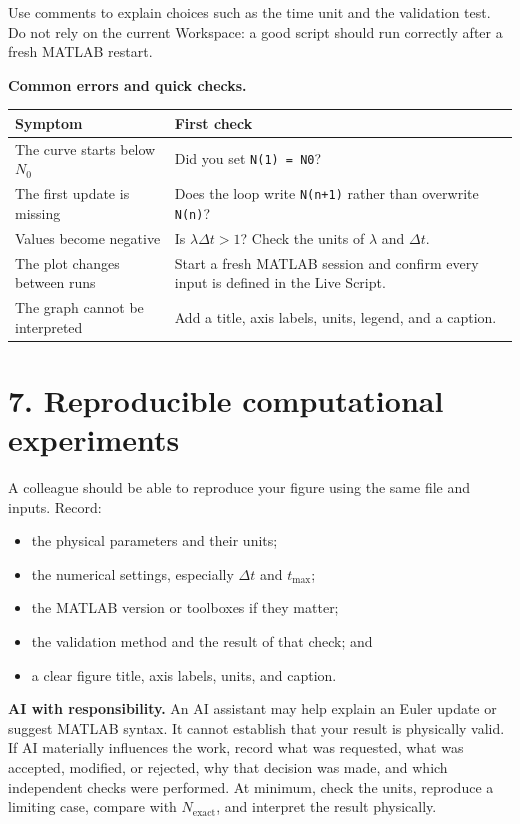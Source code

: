 \documentclass[11pt,a4paper]{article}
\begin{document}
Use comments to explain choices such as the time unit and the validation test. Do not rely on the current Workspace: a good script should run correctly after a fresh MATLAB restart.

\textbf{Common errors and quick checks.}
\begin{center}
\small
\begin{tabular}{>{\raggedright\arraybackslash}p{.38\linewidth}>{\raggedright\arraybackslash}p{.48\linewidth}}
\toprule
\textbf{Symptom} & \textbf{First check}\\ \midrule
The curve starts below $N_0$ & Did you set \texttt{N(1) = N0}?\\
The first update is missing & Does the loop write \texttt{N(n+1)} rather than overwrite \texttt{N(n)}?\\
Values become negative & Is $\lambda\Delta t>1$? Check the units of $\lambda$ and $\Delta t$.\\
The plot changes between runs & Start a fresh MATLAB session and confirm every input is defined in the Live Script.\\
The graph cannot be interpreted & Add a title, axis labels, units, legend, and a caption.\\ \bottomrule
\end{tabular}
\end{center}

\newpage
\section*{7. Reproducible computational experiments}
A colleague should be able to reproduce your figure using the same file and inputs. Record:
\begin{itemize}[nosep,leftmargin=5mm]
  \item the physical parameters and their units;
  \item the numerical settings, especially $\Delta t$ and $t_{\max}$;
  \item the MATLAB version or toolboxes if they matter;
  \item the validation method and the result of that check; and
  \item a clear figure title, axis labels, units, and caption.
\end{itemize}

\begin{aibox}
\textbf{AI with responsibility.} An AI assistant may help explain an Euler update or suggest MATLAB syntax. It cannot establish that your result is physically valid. If AI materially influences the work, record what was requested, what was accepted, modified, or rejected, why that decision was made, and which independent checks were performed. At minimum, check the units, reproduce a limiting case, compare with $N_{\mathrm{exact}}$, and interpret the result physically.
\end{aibox}
\end{document}
